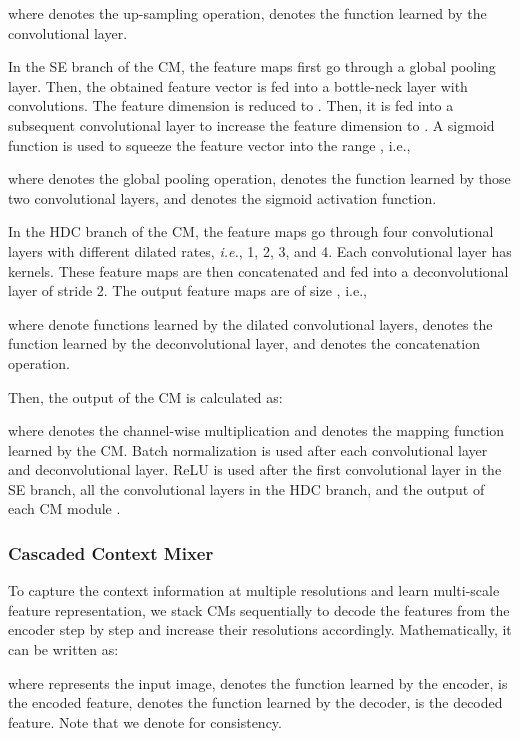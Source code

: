 \documentclass[twocolumn]{svjour3}          \smartqed  \usepackage{natbib}
\begin{document}
where  denotes the up-sampling operation,  denotes the function learned by the convolutional layer.

In the SE branch of the  CM, the feature maps  first go through a global pooling layer. Then, the obtained feature vector is fed into a bottle-neck layer with  convolutions. The feature dimension is reduced to . Then, it is fed into a subsequent  convolutional layer to increase the feature dimension to . A sigmoid function is used to squeeze the feature vector  into the range , i.e.,

where  denotes the global pooling operation,  denotes the function learned by those two  convolutional layers, and  denotes the sigmoid activation function.

In the HDC branch of the  CM, the feature maps  go through four  convolutional layers with different dilated rates, \emph{i.e.}, 1, 2, 3, and 4. Each convolutional layer has  kernels. These feature maps are then concatenated and fed into a deconvolutional layer of stride 2. The output feature maps 
are of size , i.e.,

where  denote functions learned by the dilated convolutional layers,  denotes the function learned by the deconvolutional layer, and  denotes the concatenation operation.

Then, the output of the  CM is calculated as:

where  denotes the channel-wise multiplication and  denotes the mapping function learned by the  CM. Batch normalization \citep{ioffe2015batch} is used after each convolutional layer and deconvolutional layer. ReLU is used after the first convolutional layer in the SE branch, all the convolutional layers in the HDC branch, and the output of each CM module \citep{krizhevsky2012imagenet}.


\subsubsection{Cascaded Context Mixer}
\label{subsubsec:CCM}
To capture the context information at multiple resolutions and learn multi-scale feature representation, we stack  CMs sequentially to decode the features from the encoder step by step and increase their resolutions accordingly. Mathematically, it can be written as:


where  represents the input image,  denotes the function learned by the encoder,  is the encoded feature,  denotes the function learned by the decoder,  is the decoded feature. Note that we denote  for consistency.
\end{document}
